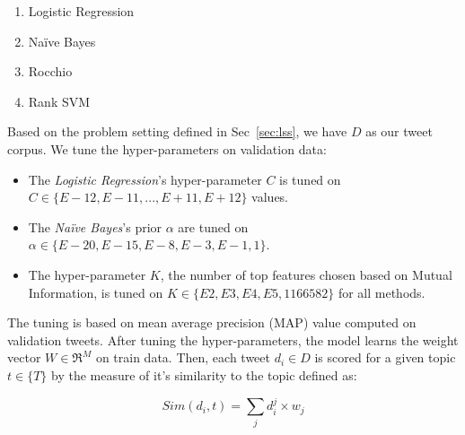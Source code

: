 \begin{enumerate}
\item Logistic Regression
\item Na\"{i}ve Bayes
\item Rocchio %
\item Rank SVM
\end{enumerate}

Based on the problem setting defined in Sec~\ref{sec:lss}, we have $D$ as our tweet corpus. We tune the hyper-parameters on validation data:
\begin{itemize}
\item The \textit{Logistic Regression}'s hyper-parameter $C$ is tuned on $C \in \{E-12, E-11, ..., E+11, E+12\}$ values.
\item The \textit{Na\"{i}ve Bayes}'s prior $\alpha$ are tuned on $\alpha \in \{E-20, E-15, E-8, E-3, E-1, 1\}$.
\item The hyper-parameter $K$, the number of top features chosen based on Mutual Information, is tuned on $K \in \{E2, E3, E4, E5, 1166582\}$ for all methods.
\end{itemize}
The tuning is based on mean average precision (MAP) value computed on validation tweets. After tuning the hyper-parameters, the model learns the weight vector $W \in \Re^{M}$ on train data. Then, each tweet ${d_{i}} \in D$ is scored for a given topic ${t \in \{ T \}}$ by the measure of it's similarity to the topic defined as:

\begin{equation}
Sim({d_{i}}, t) = \sum_{j} d_{i}^{j} \times {w_{j}}
\label{eq:similarity}
\end{equation}

